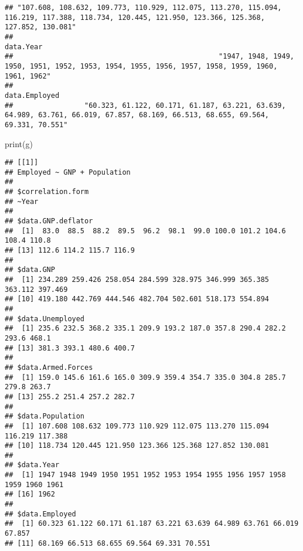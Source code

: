 \documentclass[
]{article}
\newenvironment{Shaded}{\begin{snugshade}}{\end{snugshade}}
\newcommand{\FunctionTok}[1]{\textcolor[rgb]{0.00,0.00,0.00}{#1}}
\newcommand{\NormalTok}[1]{#1}
\begin{document}
\begin{verbatim}
## "107.608, 108.632, 109.773, 110.929, 112.075, 113.270, 115.094, 116.219, 117.388, 118.734, 120.445, 121.950, 123.366, 125.368, 127.852, 130.081" 
##                                                                                                                                        data.Year 
##                                                 "1947, 1948, 1949, 1950, 1951, 1952, 1953, 1954, 1955, 1956, 1957, 1958, 1959, 1960, 1961, 1962" 
##                                                                                                                                    data.Employed 
##                 "60.323, 61.122, 60.171, 61.187, 63.221, 63.639, 64.989, 63.761, 66.019, 67.857, 68.169, 66.513, 68.655, 69.564, 69.331, 70.551"
\end{verbatim}

\begin{Shaded}
\begin{Highlighting}[]
\FunctionTok{print}\NormalTok{(g)}
\end{Highlighting}
\end{Shaded}

\begin{verbatim}
## [[1]]
## Employed ~ GNP + Population
## 
## $correlation.form
## ~Year
## 
## $data.GNP.deflator
##  [1]  83.0  88.5  88.2  89.5  96.2  98.1  99.0 100.0 101.2 104.6 108.4 110.8
## [13] 112.6 114.2 115.7 116.9
## 
## $data.GNP
##  [1] 234.289 259.426 258.054 284.599 328.975 346.999 365.385 363.112 397.469
## [10] 419.180 442.769 444.546 482.704 502.601 518.173 554.894
## 
## $data.Unemployed
##  [1] 235.6 232.5 368.2 335.1 209.9 193.2 187.0 357.8 290.4 282.2 293.6 468.1
## [13] 381.3 393.1 480.6 400.7
## 
## $data.Armed.Forces
##  [1] 159.0 145.6 161.6 165.0 309.9 359.4 354.7 335.0 304.8 285.7 279.8 263.7
## [13] 255.2 251.4 257.2 282.7
## 
## $data.Population
##  [1] 107.608 108.632 109.773 110.929 112.075 113.270 115.094 116.219 117.388
## [10] 118.734 120.445 121.950 123.366 125.368 127.852 130.081
## 
## $data.Year
##  [1] 1947 1948 1949 1950 1951 1952 1953 1954 1955 1956 1957 1958 1959 1960 1961
## [16] 1962
## 
## $data.Employed
##  [1] 60.323 61.122 60.171 61.187 63.221 63.639 64.989 63.761 66.019 67.857
## [11] 68.169 66.513 68.655 69.564 69.331 70.551
\end{verbatim}
\end{document}
